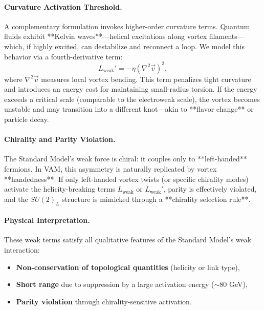 \vspace{0.5em}
\paragraph{Curvature Activation Threshold.}
A complementary formulation invokes higher-order curvature terms. Quantum fluids exhibit **Kelvin waves**—helical excitations along vortex filaments—which, if highly excited, can destabilize and reconnect a loop. We model this behavior via a fourth-derivative term:
\begin{equation}
    L_{\text{weak}}' = -\eta \left( \nabla^2 \vec{v} \right)^2,
    \label{eq:kelvin-wave-term}
\end{equation}
where \( \nabla^2 \vec{v} \) measures local vortex bending. This term penalizes tight curvature and introduces an energy cost for maintaining small-radius torsion. If the energy exceeds a critical scale (comparable to the electroweak scale), the vortex becomes unstable and may transition into a different knot—akin to **flavor change** or particle decay.

\vspace{0.5em}
\paragraph{Chirality and Parity Violation.}
The Standard Model’s weak force is chiral: it couples only to **left-handed** fermions. In VAM, this asymmetry is naturally replicated by vortex **handedness**. If only left-handed vortex twists (or specific chirality modes) activate the helicity-breaking terms \( L_{\text{weak}} \) or \( L_{\text{weak}}' \), parity is effectively violated, and the \( SU(2)_L \) structure is mimicked through a **chirality selection rule**.

\vspace{0.5em}
\paragraph{Physical Interpretation.}
These weak terms satisfy all qualitative features of the Standard Model’s weak interaction:
\begin{itemize}
    \item \textbf{Non-conservation of topological quantities} (helicity or link type),
    \item \textbf{Short range} due to suppression by a large activation energy (\( \sim 80 \) GeV),
    \item \textbf{Parity violation} through chirality-sensitive activation.
\end{itemize}

